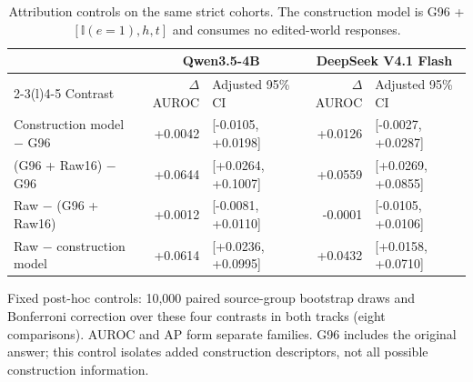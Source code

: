 \begin{table}[t]
\centering\small
\caption{Attribution controls on the same strict cohorts. The construction model is G96 + $[\mathbb{I}(e=1),h,t]$ and consumes no edited-world responses.}
\label{tab:controls}
\setlength{\tabcolsep}{4pt}
\begin{tabular}{@{}lrlrl@{}}
\toprule
& \multicolumn{2}{c}{Qwen3.5-4B} & \multicolumn{2}{c}{DeepSeek V4.1 Flash}\\\cmidrule(lr){2-3}\cmidrule(l){4-5} Contrast & $\Delta$AUROC & Adjusted 95\% CI & $\Delta$AUROC & Adjusted 95\% CI\\
\midrule
Construction model $-$ G96 & +0.0042 & [-0.0105, +0.0198] & +0.0126 & [-0.0027, +0.0287]\\
(G96 + Raw16) $-$ G96 & +0.0644 & [+0.0264, +0.1007] & +0.0559 & [+0.0269, +0.0855]\\
Raw $-$ (G96 + Raw16) & +0.0012 & [-0.0081, +0.0110] & -0.0001 & [-0.0105, +0.0106]\\
Raw $-$ construction model & +0.0614 & [+0.0236, +0.0995] & +0.0432 & [+0.0158, +0.0710]\\
\bottomrule
\end{tabular}
\par\vspace{3pt}\begin{minipage}{\textwidth}\footnotesize Fixed post-hoc controls: 10,000 paired source-group bootstrap draws and Bonferroni correction over these four contrasts in both tracks (eight comparisons). AUROC and AP form separate families. G96 includes the original answer; this control isolates added construction descriptors, not all possible construction information.\end{minipage}
\end{table}
